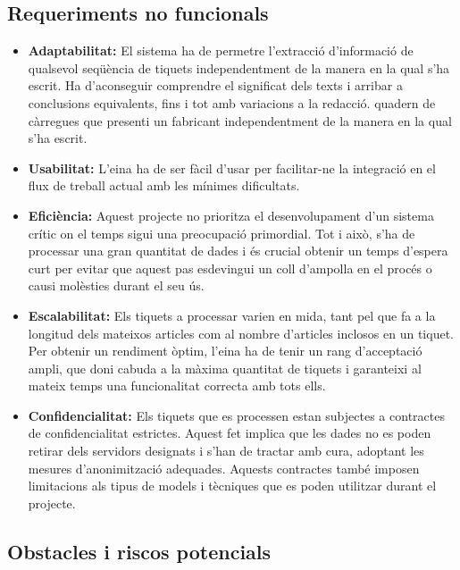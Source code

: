 \subsection{Requeriments no funcionals} \label{ssec:abast-requeriments-no-funcionals}

\begin{itemize}
    \item \textbf{Adaptabilitat:} El sistema ha de permetre l'extracció d'informació de qualsevol seqüència de tiquets independentment de la manera en la qual s'ha escrit. Ha d'aconseguir comprendre el significat dels texts i arribar a conclusions equivalents, fins i tot amb variacions a la redacció.
    quadern de càrregues que presenti un fabricant independentment de la manera en la qual s'ha escrit.
    \item \textbf{Usabilitat:} L'eina ha de ser fàcil d'usar per facilitar-ne la integració en el flux de treball actual amb les mínimes dificultats.
    \item \textbf{Eficiència:} Aquest projecte no prioritza el desenvolupament d'un sistema crític on el temps sigui una preocupació primordial. Tot i això, s'ha de processar una gran quantitat de dades i és crucial obtenir un temps d'espera curt per evitar que aquest pas esdevingui un coll d'ampolla en el procés o causi molèsties durant el seu ús.
    \item \textbf{Escalabilitat:} Els tiquets a processar varien en mida, tant pel que fa a la longitud dels mateixos articles com al nombre d'articles inclosos en un tiquet. Per obtenir un rendiment òptim, l'eina ha de tenir un rang d'acceptació ampli, que doni cabuda a la màxima quantitat de tiquets i garanteixi al mateix temps una funcionalitat correcta amb tots ells.
    \item \textbf{Confidencialitat:} Els tiquets que es processen estan subjectes a contractes de confidencialitat estrictes. Aquest fet implica que les dades no es poden retirar dels servidors designats i s'han de tractar amb cura, adoptant les mesures d'anonimització adequades. Aquests contractes també imposen limitacions als tipus de models i tècniques que es poden utilitzar durant el projecte.
\end{itemize}


\subsection{Obstacles i riscos potencials} \label{ssec:abast-riscos}

